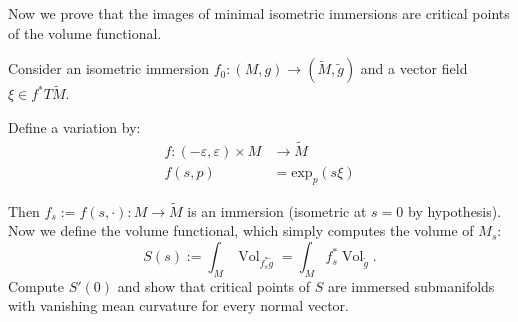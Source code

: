 \medskip\noindent

Now we prove that the images of minimal isometric immersions are critical points
of the volume functional.

\begin{exercise}
\label{exercise-minimal-isometric-immersions
-are-critical-points-of-volume-functional}
Consider an isometric immersion $f_0:(M,g) \to(\tilde{M},\tilde{g})$ and a
vector field $\xi \in f^*T\tilde{M}$.

Define a variation by:
\begin{align*}
f: (-\varepsilon,\varepsilon)\times M &\longrightarrow \tilde{M} \\
f(s,p) &=\text{exp}_{p}(s \xi)
\end{align*}

Then $f_s:=f(s,\cdot):M \longrightarrow \tilde{M}$ is an immersion (isometric at
$s=0$ by hypothesis). Now we define the volume functional, which simply 
computes the volume of $M_s$:
$$
S(s):= \int_{M}\operatorname{Vol}_{f_s ^*\tilde{g}}
=\int_M f_s^*\operatorname{Vol}_{\tilde{g}}.
$$
Compute $S'(0)$ and show that critical points of $S$ are immersed submanifolds with
vanishing mean curvature for every normal vector.
\end{exercise}

